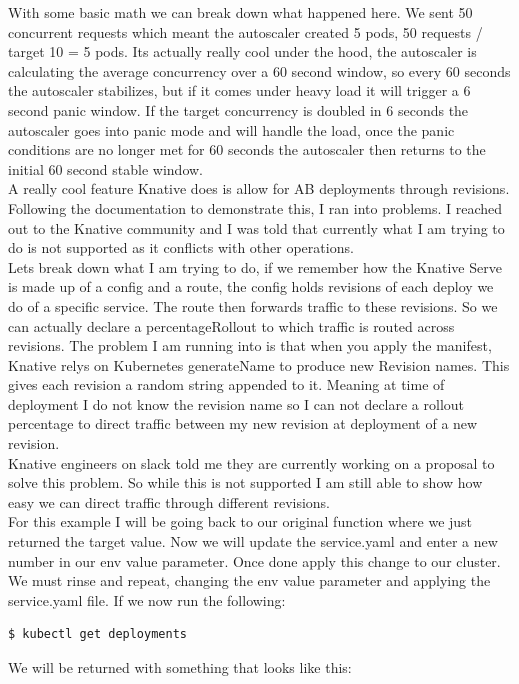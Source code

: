 With some basic math we can break down what happened here. We sent 50 concurrent requests which meant the autoscaler created 5 pods, 50 requests / target 10 = 5 pods. Its actually really cool under the hood, the autoscaler is calculating the average concurrency over a 60 second window, so every 60 seconds the autoscaler stabilizes, but if it comes under heavy load it will trigger a 6 second panic window. If the target concurrency is doubled in 6 seconds the autoscaler goes into panic mode and will handle the load, once the panic conditions are no longer met for 60 seconds the autoscaler then returns to the initial 60 second stable window.
\\A really cool feature Knative does is allow for AB deployments through revisions. Following the documentation to demonstrate this, I ran into problems. I reached out to the Knative community and I was told that currently what I am trying to do is not supported as it conflicts with other operations. 
\\Lets break down what I am trying to do, if we remember how the Knative Serve is made up of a config and a route, the config holds revisions of each deploy we do of a specific service. The route then forwards traffic to these revisions. So we can actually declare a percentageRollout to which traffic is routed across revisions. The problem I am running into is that when you apply the manifest, Knative relys on Kubernetes generateName to produce new Revision names. This gives each revision a random string appended to it. Meaning at time of deployment I do not know the revision name so I can not declare a rollout percentage to direct traffic between my new revision at deployment of a new revision. 
\\Knative engineers on slack told me they are currently working on a proposal to solve this problem. So while this is not supported I am still able to show how easy we can direct traffic through different revisions. 
\\For this example I will be going back to our original function where we just returned the target value. Now we will update the service.yaml and enter a new number in our env value parameter. Once done apply this change to our cluster. We must rinse and repeat, changing the env value parameter and applying the service.yaml file. If we now run the following:
\begin{lstlisting}[language=bash]
$ kubectl get deployments
\end{lstlisting}
We will be returned with something that looks like this:
